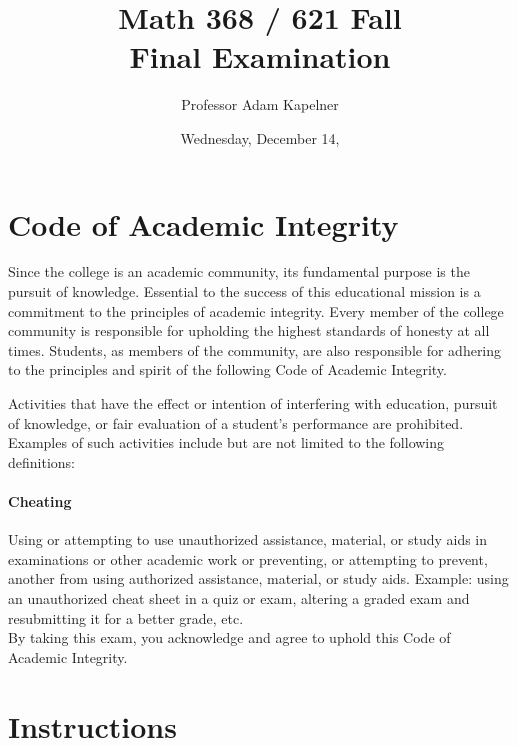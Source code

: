\documentclass[12pt,landscape]{article}
\title{Math 368 / 621 Fall \the\year{} \\ Final Examination}
\author{Professor Adam Kapelner}
\date{Wednesday, December 14, \the\year{}}
\begin{document}
\maketitle


\thispagestyle{empty}

\section*{Code of Academic Integrity}

\footnotesize
Since the college is an academic community, its fundamental purpose is the pursuit of knowledge. Essential to the success of this educational mission is a commitment to the principles of academic integrity. Every member of the college community is responsible for upholding the highest standards of honesty at all times. Students, as members of the community, are also responsible for adhering to the principles and spirit of the following Code of Academic Integrity.

Activities that have the effect or intention of interfering with education, pursuit of knowledge, or fair evaluation of a student's performance are prohibited. Examples of such activities include but are not limited to the following definitions:

\paragraph{Cheating} Using or attempting to use unauthorized assistance, material, or study aids in examinations or other academic work or preventing, or attempting to prevent, another from using authorized assistance, material, or study aids. Example: using an unauthorized cheat sheet in a quiz or exam, altering a graded exam and resubmitting it for a better grade, etc.
\\

\noindent By taking this exam, you acknowledge and agree to uphold this Code of Academic Integrity. \\


\normalsize

\section*{Instructions}
\end{document}
